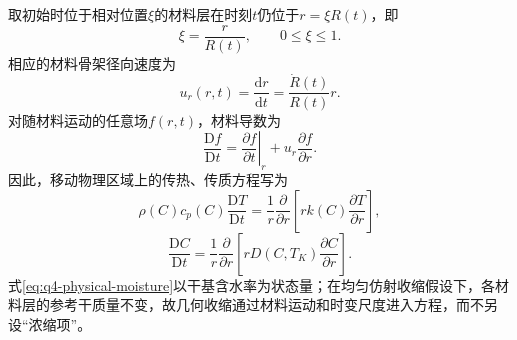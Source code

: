 \documentclass[withoutpreface,bwprint]{cumcmthesis}
\begin{document}
取初始时位于相对位置$\xi$的材料层在时刻$t$仍位于$r=\xi R(t)$，即
\begin{equation}
\boxed{
\xi=\frac{r}{R(t)},
\qquad 0\le\xi\le1.
}
\label{eq:q4-material-coordinate}
\end{equation}
相应的材料骨架径向速度为
\begin{equation}
u_r(r,t)
=\frac{\mathrm dr}{\mathrm dt}
=\frac{\dot R(t)}{R(t)}r.
\label{eq:q4-solid-velocity}
\end{equation}
对随材料运动的任意场$f(r,t)$，材料导数为
\begin{equation}
\frac{\mathrm Df}{\mathrm Dt}
=\left.\frac{\partial f}{\partial t}\right|_r
+u_r\frac{\partial f}{\partial r}.
\label{eq:q4-material-derivative}
\end{equation}
因此，移动物理区域上的传热、传质方程写为
\begin{equation}
\rho(C)c_p(C)\frac{\mathrm DT}{\mathrm Dt}
=\frac{1}{r}\frac{\partial}{\partial r}
\left[rk(C)\frac{\partial T}{\partial r}\right],
\label{eq:q4-physical-heat}
\end{equation}
\begin{equation}
\frac{\mathrm DC}{\mathrm Dt}
=\frac{1}{r}\frac{\partial}{\partial r}
\left[rD(C,T_K)\frac{\partial C}{\partial r}\right].
\label{eq:q4-physical-moisture}
\end{equation}
式\eqref{eq:q4-physical-moisture}以干基含水率为状态量；在均匀仿射收缩假设下，各材料层的参考干质量不变，故几何收缩通过材料运动和时变尺度进入方程，而不另设“浓缩项”。
\end{document}
